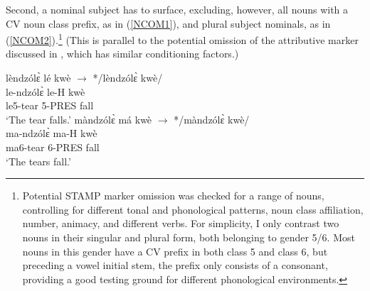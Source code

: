 Second, a nominal subject has to surface, excluding, however, all nouns with a CV noun class prefix, as in (\ref{NCOM1}), and plural subject nominals, as in (\ref{NCOM2}).\footnote{Potential STAMP marker omission was checked for a range of nouns, controlling for different tonal and phonological patterns, noun class affiliation, number, animacy, and different verbs. For simplicity, I only contrast two nouns in their singular and plural form, both belonging to gender 5/6. Most nouns in this gender have a CV prefix in both class 5 and class 6, but preceding a vowel initial stem, the prefix only consists of a consonant, providing a good testing ground for different phonological environments.} (This is parallel to the potential omission of the attributive marker discussed in , which has similar conditioning factors.)






\begin{exe}
\ex\label{NCOM1}
\begin{xlist}
\ex \label{NCOM1a}
   \glll   lèndzólɛ̀ lé kwè   $\rightarrow$ */lèndzólɛ̀ kwè/ \\
          le-ndzólɛ̀ le-H kwè   \\
            le5-tear 5-PRES fall  \\
    \trans `The tear falls.'
\ex\label{NCOM1b}
\glll   màndzólɛ̀ má kwè   $\rightarrow$ */màndzólɛ̀ kwè/ \\
          ma-ndzólɛ̀ ma-H kwè   \\
            ma6-tear 6-PRES fall  \\
    \trans `The tears fall.' 
\end{xlist}
\end{exe}


